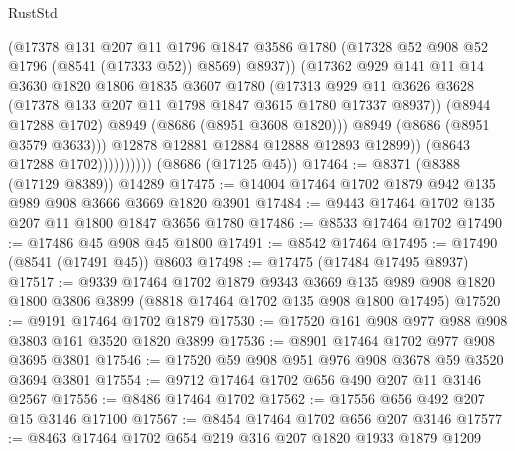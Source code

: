 \begin{lexlean}{RustStd}
\begin{coremodule}
                              (@17378
                                @131
                                @207
                                @11
                                @1796
                                @1847
                                @3586
                                @1780
                                (@17328 @52 @908 @52 @1796 (@8541 (@17333 @52)) @8569)
                                @8937))
                            (@17362
                              @929
                              @141
                              @11
                              @14
                              @3630
                              @1820
                              @1806
                              @1835
                              @3607
                              @1780
                              (@17313
                                @929
                                @11
                                @3626
                                @3628
                                (@17378 @133 @207 @11 @1798 @1847 @3615 @1780 @17337 @8937))
                              (@8944 @17288 @1702)
                              @8949
                              (@8686 (@8951 @3608 @1820)))
                            @8949
                            (@8686 (@8951 @3579 @3633)))
                          @12878
                          @12881
                          @12884
                          @12888
                          @12893
                          @12899))
                      (@8643 @17288 @1702))))))))))
    (@8686 (@17125 @45))
@17464 := @8371 (@8388 (@17129 @8389)) @14289
@17475 := @14004 @17464 @1702 @1879 @942 @135 @989 @908 @3666 @3669 @1820 @3901
@17484 := @9443 @17464 @1702 @135 @207 @11 @1800 @1847 @3656 @1780
@17486 := @8533 @17464 @1702
@17490 := @17486 @45 @908 @45 @1800
@17491 := @8542 @17464
@17495 := @17490 (@8541 (@17491 @45)) @8603
@17498 := @17475 (@17484 @17495 @8937)
@17517 := @9339
    @17464
    @1702
    @1879
    @9343
    @3669
    @135
    @989
    @908
    @1820
    @1800
    @3806
    @3899
    (@8818 @17464 @1702 @135 @908 @1800 @17495)
@17520 := @9191 @17464 @1702 @1879
@17530 := @17520 @161 @908 @977 @988 @908 @3803 @161 @3520 @1820 @3899
@17536 := @8901 @17464 @1702 @977 @908 @3695 @3801
@17546 := @17520 @59 @908 @951 @976 @908 @3678 @59 @3520 @3694 @3801
@17554 := @9712 @17464 @1702 @656 @490 @207 @11 @3146 @2567
@17556 := @8486 @17464 @1702
@17562 := @17556 @656 @492 @207 @15 @3146 @17100
@17567 := @8454 @17464 @1702 @656 @207 @3146
@17577 := @8463 @17464 @1702 @654 @219 @316 @207 @1820 @1933 @1879 @1209

\end{coremodule}
\end{lexlean}
